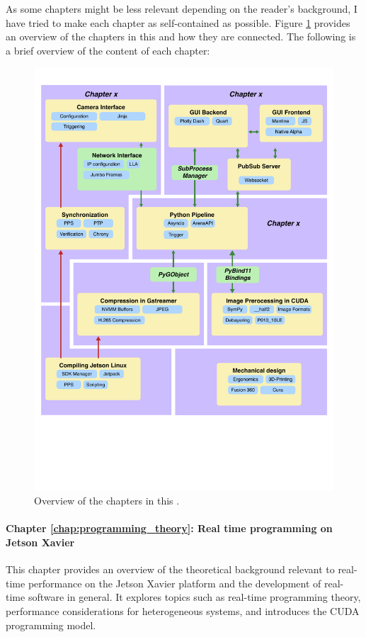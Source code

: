 As some chapters might be less relevant depending on the reader's background, I have tried to make each chapter as self-contained as possible.
Figure \ref{fig:overview} provides an overview of the chapters in this \master and how they are connected.
The following is a brief overview of the content of each chapter:

\begin{figure}[H]
    \includegraphics[width=\textwidth]{chapters/10_intro/chapter_overview.pdf}
    \caption{Overview of the chapters in this \master.}
    \label{fig:overview}
\end{figure}


\paragraph{Chapter \ref{chap:programming_theory}: Real time programming on Jetson Xavier}
This chapter provides an overview of the theoretical background relevant to real-time performance on the Jetson Xavier platform and the development of real-time software in general.
It explores topics such as real-time programming theory, performance considerations for heterogeneous systems, and introduces the CUDA programming model.

